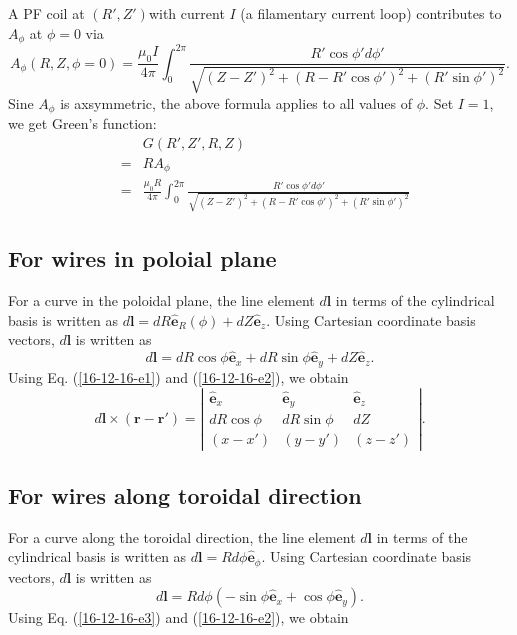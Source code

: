 \documentclass{llncs}
\begin{document}
A PF coil at $(R', Z') $with current $I$ (a filamentary current loop)
contributes to $A_{\phi}$ at $\phi = 0$ via
\begin{equation}
  A_{\phi} (R, Z, \phi = 0) = \frac{\mu_0 I}{4 \pi} \int_0^{2 \pi} \frac{R'
  \cos \phi' d \phi'}{\sqrt{(Z - Z')^2 + (R - R' \cos \phi')^2 + (R' \sin
  \phi')^2}} .
\end{equation}
Sine $A_{\phi}$ is axsymmetric, the above formula applies to all values of
$\phi$. Set $I = 1$, we get Green's function:
\begin{eqnarray}
  &  & G (R', Z', R, Z) \nonumber\\
  & = & R A_{\phi} \nonumber\\
  & = & \frac{\mu_0 R}{4 \pi} \int_0^{2 \pi} \frac{R' \cos \phi' d
  \phi'}{\sqrt{(Z - Z')^2 + (R - R' \cos \phi')^2 + (R' \sin \phi')^2}} 
  \label{24-5-29-p1}
\end{eqnarray}


\subsection{For wires in poloial plane}

For a curve in the poloidal plane, the line element $d\mathbf{l}$ in terms of
the cylindrical basis is written as $d\mathbf{l}= d R \hat{\mathbf{e}}_R
(\phi) + d Z \hat{\mathbf{e}}_z$. Using Cartesian coordinate basis vectors,
$d\mathbf{l}$ is written as
\begin{equation}
  \label{16-12-16-e1} d\mathbf{l}= d R \cos \phi \hat{\mathbf{e}}_x + d R \sin
  \phi \hat{\mathbf{e}}_y + d Z \hat{\mathbf{e}}_z .
\end{equation}
Using Eq. (\ref{16-12-16-e1}) and (\ref{16-12-16-e2}), we obtain
\begin{equation}
  d\mathbf{l} \times (\mathbf{r}-\mathbf{r}') = \left|\begin{array}{ccc}
    \hat{\mathbf{e}}_x & \hat{\mathbf{e}}_y & \hat{\mathbf{e}}_z\\
    d R \cos \phi & d R \sin \phi & d Z\\
    (x - x') & (y - y') & (z - z')
  \end{array}\right| .
\end{equation}

\subsection{For wires along toroidal direction}

For a curve along the toroidal direction, the line element $d\mathbf{l}$ in
terms of the cylindrical basis is written as $d\mathbf{l}= R d \phi
\hat{\mathbf{e}}_{\phi}$. Using Cartesian coordinate basis vectors,
$d\mathbf{l}$ is written as
\begin{equation}
  \label{16-12-16-e3} d\mathbf{l}= R d \phi (- \sin \phi \hat{\mathbf{e}}_x +
  \cos \phi \hat{\mathbf{e}}_y) .
\end{equation}
Using Eq. (\ref{16-12-16-e3}) and (\ref{16-12-16-e2}), we obtain
\end{document}
